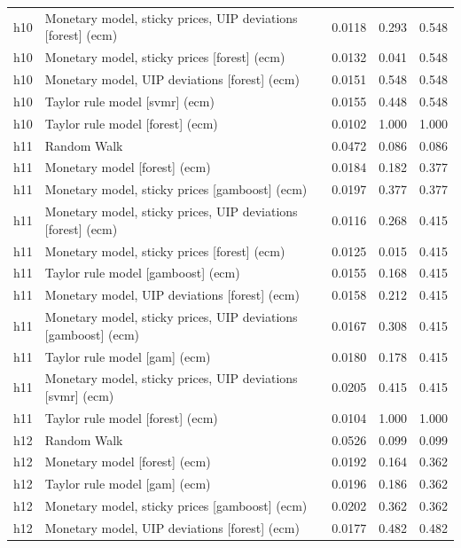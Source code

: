 \begin{ThreePartTable}
\begin{longtable}[t]{cp{5.5cm}ccc}
h10 & \raggedright Monetary model, sticky prices, UIP deviations [forest] (ecm) & 0.0118 & 0.293 & 0.548\\
h10 & \raggedright Monetary model, sticky prices [forest] (ecm) & 0.0132 & 0.041 & 0.548\\
h10 & \raggedright Monetary model, UIP deviations [forest] (ecm) & 0.0151 & 0.548 & 0.548\\
h10 & \raggedright Taylor rule model [svmr] (ecm) & 0.0155 & 0.448 & 0.548\\
h10 & \raggedright Taylor rule model [forest] (ecm) & 0.0102 & 1.000 & 1.000\\
\addlinespace
h11 & \raggedright Random Walk & 0.0472 & 0.086 & 0.086\\
h11 & \raggedright Monetary model [forest] (ecm) & 0.0184 & 0.182 & 0.377\\
h11 & \raggedright Monetary model, sticky prices [gamboost] (ecm) & 0.0197 & 0.377 & 0.377\\
h11 & \raggedright Monetary model, sticky prices, UIP deviations [forest] (ecm) & 0.0116 & 0.268 & 0.415\\
h11 & \raggedright Monetary model, sticky prices [forest] (ecm) & 0.0125 & 0.015 & 0.415\\
h11 & \raggedright Taylor rule model [gamboost] (ecm) & 0.0155 & 0.168 & 0.415\\
h11 & \raggedright Monetary model, UIP deviations [forest] (ecm) & 0.0158 & 0.212 & 0.415\\
h11 & \raggedright Monetary model, sticky prices, UIP deviations [gamboost] (ecm) & 0.0167 & 0.308 & 0.415\\
h11 & \raggedright Taylor rule model [gam] (ecm) & 0.0180 & 0.178 & 0.415\\
h11 & \raggedright Monetary model, sticky prices, UIP deviations [svmr] (ecm) & 0.0205 & 0.415 & 0.415\\
h11 & \raggedright Taylor rule model [forest] (ecm) & 0.0104 & 1.000 & 1.000\\
\addlinespace
h12 & \raggedright Random Walk & 0.0526 & 0.099 & 0.099\\
h12 & \raggedright Monetary model [forest] (ecm) & 0.0192 & 0.164 & 0.362\\
h12 & \raggedright Taylor rule model [gam] (ecm) & 0.0196 & 0.186 & 0.362\\
h12 & \raggedright Monetary model, sticky prices [gamboost] (ecm) & 0.0202 & 0.362 & 0.362\\
h12 & \raggedright Monetary model, UIP deviations [forest] (ecm) & 0.0177 & 0.482 & 0.482\\

\end{longtable}
\end{ThreePartTable}
